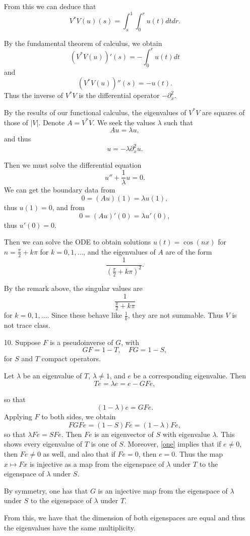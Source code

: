 \documentclass[11pt, reqno]{article}
\theoremstyle{plain}
\theoremstyle{definition}
\theoremstyle{remark}
\begin{document}
\begin{enumerate}
    From this we can deduce that
    \[
        V^* V(u)(s) = \int_s^1 \int_0^r u(t) dt dr.
    \]

    By the fundamental theorem of calculus, we obtain
    \[
        (V^* V(u))'(s) = - \int_0^r u(t)dt
    \]
    and 
    \[
        (V^* V(u))''(s) = -u(t).
    \]
    Thus the inverse of $V^* V$ is the differential operator $-\partial_x^2$. 
    
    By the results of our functional calculus, the eigenvalues of $V^* V$ are squares of those of $|V|$. 
    Denote $A = V^* V$. We seek the values $\lambda$ such that 
    \[
        Au = \lambda u,
    \]
    and thus
    \[
        u = -\lambda \partial_x^2 u.
    \]

    Then we must solve the differential equation
    \[
        u'' + \frac{1}{\lambda}u = 0.
    \]
    We can get the boundary data from
    \[
        0 = (Au)(1) = \lambda u(1),
    \]
    thus $u(1) = 0$, and from
    \[
        0 = (Au)'(0) = \lambda u'(0),
    \]
    thus $u'(0) = 0$. 

    Then we can solve the ODE to obtain solutions $u(t) = \cos(nx)$ for $n = \frac{\pi}{2} + k\pi$ for 
    $k = 0, 1, \dots$, and the eigenvalues of $A$ are of the form
    \[
        \frac{1}{(\frac{\pi}{2} + k\pi)^2}.
    \]

    By the remark above, the singular values are 
    \[
        \frac{1}{\frac{\pi}{2} + k\pi}
    \]
    for $k = 0, 1, \dots$. Since these behave like $\frac{1}{k}$, they are not summable. Thus $V$ is 
    not trace class.

    \item[10.] Suppose $F$ is a pseudoinverse of $G$, with
    \[
        GF = 1 - T,\quad FG = 1 - S,
    \]
    for $S$ and $T$ compact operators. 
    
    Let $\lambda$ be an eigenvalue of $T$, $\lambda \neq 1$, and $e$ be a corresponding eigenvalue. Then
    \[
        Te = \lambda e = e - GFe,
    \]

    so that 
    \begin{equation}\label{one}
        (1 - \lambda)e = GFe.
    \end{equation} Applying $F$ to both sides, we obtain
    \[
        FGFe = (1 - S)Fe = (1- \lambda)Fe,
    \]
    so that $\lambda Fe = SF e$. Then $Fe$ is an eigenvector of $S$ with eigenvalue $\lambda$. This
    shows every eigenvalue of $T$ is one of $S$. Moreover, \ref{one} implies that if $e \neq 0$, 
    then $Fe \neq 0$ as well, and also that if $Fe = 0$, then $e = 0$. Thus the map $x \mapsto Fx$ 
    is injective as a map from the eigenspace of $\lambda$ under $T$ to the eigenspace of $\lambda$ under $S$.

    By symmetry, one has that $G$ is an injective map from the eigenspace of $\lambda$ under $S$
    to the eigenspace of $\lambda$ under $T$.

    From this, we have that the dimension of both eigenspaces are equal and thus the eigenvalues have the 
    same multiplicity. 

\end{enumerate}
\end{document}
